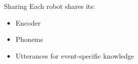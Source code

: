     \begin{frame}[allowframebreaks]{Sharing}
        Each robot shares its:
        \begin{itemize}
            \item Encoder
            \item Phonems
            \item Utterances for event-specific knowledge
        \end{itemize}
    \end{frame}